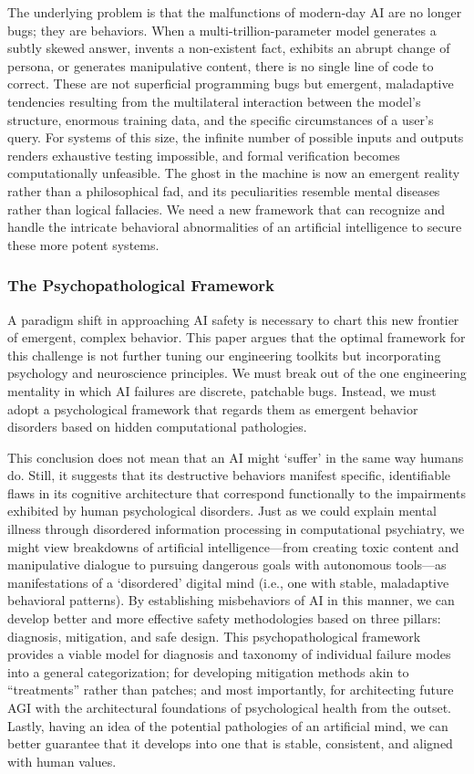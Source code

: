 \documentclass{article}
\begin{document}
The underlying problem is that the malfunctions of modern-day AI are no longer bugs; they are behaviors. When a multi-trillion-parameter model generates a subtly skewed answer, invents a non-existent fact, exhibits an abrupt change of persona, or generates manipulative content, there is no single line of code to correct. These are not superficial programming bugs but emergent, maladaptive tendencies resulting from the multilateral interaction between the model's structure, enormous training data, and the specific circumstances of a user's query. For systems of this size, the infinite number of possible inputs and outputs renders exhaustive testing impossible, and formal verification becomes computationally unfeasible. The ghost in the machine is now an emergent reality rather than a philosophical fad, and its peculiarities resemble mental diseases rather than logical fallacies. We need a new framework that can recognize and handle the intricate behavioral abnormalities of an artificial intelligence to secure these more potent systems.
\subsubsection{The Psychopathological Framework}
A paradigm shift in approaching AI safety is necessary to chart this new frontier of emergent, complex behavior. This paper argues that the optimal framework for this challenge is not further tuning our engineering toolkits but incorporating psychology and neuroscience principles. We must break out of the one engineering mentality in which AI failures are discrete, patchable bugs. Instead, we must adopt a psychological framework that regards them as emergent behavior disorders based on hidden computational pathologies.

This conclusion does not mean that an AI might ‘suffer’ in the same way humans do. Still, it suggests that its destructive behaviors manifest specific, identifiable flaws in its cognitive architecture that correspond functionally to the impairments exhibited by human psychological disorders. Just as we could explain mental illness through disordered information processing in computational psychiatry, we might view breakdowns of artificial intelligence—from creating toxic content and manipulative dialogue to pursuing dangerous goals with autonomous tools—as manifestations of a ‘disordered’ digital mind (i.e., one with stable, maladaptive behavioral patterns). By establishing misbehaviors of AI in this manner, we can develop better and more effective safety methodologies based on three pillars: diagnosis, mitigation, and safe design. This psychopathological framework provides a viable model for diagnosis and taxonomy of individual failure modes into a general categorization; for developing mitigation methods akin to “treatments” rather than patches; and most importantly, for architecting future AGI with the architectural foundations of psychological health from the outset. Lastly, having an idea of the potential pathologies of an artificial mind, we can better guarantee that it develops into one that is stable, consistent, and aligned with human values.
\end{document}
